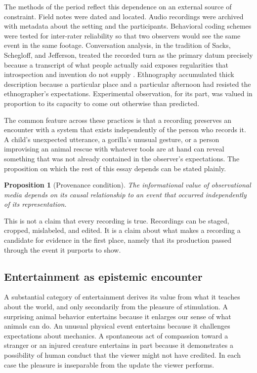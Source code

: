 \documentclass[12pt]{article}
\theoremstyle{plain}
\newtheorem{proposition}{Proposition}
\theoremstyle{definition}
\theoremstyle{remark}
\begin{document}
The methods of the period reflect this dependence on an external source of constraint. Field notes were dated and located. Audio recordings were archived with metadata about the setting and the participants. Behavioral coding schemes were tested for inter-rater reliability so that two observers would see the same event in the same footage. Conversation analysis, in the tradition of Sacks, Schegloff, and Jefferson, treated the recorded turn as the primary datum precisely because a transcript of what people actually said exposes regularities that introspection and invention do not supply \cite{sacks1974}. Ethnography accumulated thick description because a particular place and a particular afternoon had resisted the ethnographer's expectations. Experimental observation, for its part, was valued in proportion to its capacity to come out otherwise than predicted.

The common feature across these practices is that a recording preserves an encounter with a system that exists independently of the person who records it. A child's unexpected utterance, a gorilla's unusual gesture, or a person improvising an animal rescue with whatever tools are at hand can reveal something that was not already contained in the observer's expectations. The proposition on which the rest of this essay depends can be stated plainly.

\begin{proposition}[Provenance condition]\label{prop:provenance}
The informational value of observational media depends on its causal relationship to an event that occurred independently of its representation.
\end{proposition}

This is not a claim that every recording is true. Recordings can be staged, cropped, mislabeled, and edited. It is a claim about what makes a recording a candidate for evidence in the first place, namely that its production passed through the event it purports to show.

\subsection{Entertainment as epistemic encounter}

A substantial category of entertainment derives its value from what it teaches about the world, and only secondarily from the pleasure of stimulation. A surprising animal behavior entertains because it enlarges our sense of what animals can do. An unusual physical event entertains because it challenges expectations about mechanics. A spontaneous act of compassion toward a stranger or an injured creature entertains in part because it demonstrates a possibility of human conduct that the viewer might not have credited. In each case the pleasure is inseparable from the update the viewer performs.
\end{document}
